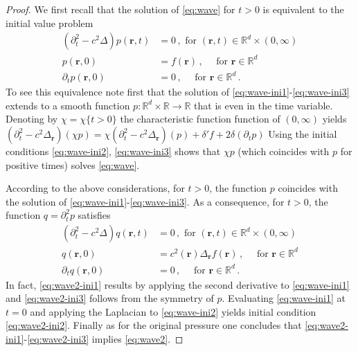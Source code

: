 \documentclass[11pt]{article}
\newcommand{\rr}{\mathbf r}
\newcommand{\source}{f}
\newcommand{\R}{\mathbb R}
\newcommand{\kl}[1]{(#1)}
\newcommand{\set}[1]{\{#1\}}
\begin{document}
\begin{proof}
	We first  recall that the solution of \eqref{eq:wave} for $t>0$  is
	equivalent to the initial value problem
	\begin{align}  \label{eq:wave-ini1}
		(\partial^2_t     -  c^2 \Delta) p(\rr,t)
		&=
		0 \,, \text{ for }
		\kl{\rr,t} \in
		\R^d \times \kl{0, \infty}
		\\ \label{eq:wave-ini2}
		p\kl{\rr,0}
		&=
		\source(\rr) \,,
		\quad \text{ for }
		\rr  \in \R^d
		\\ \label{eq:wave-ini3}
		\partial_t
		p\kl{\rr,0}
		&=0 \,,
		\quad \text{ for }
		\rr  \in \R^d \,.
	\end{align}
	To see this equivalence note first that the solution of
	\eqref{eq:wave-ini1}-\eqref{eq:wave-ini3}   extends to a smooth
	function $p\colon \R^d \times \R \to \R$ that is even in the time
	variable. Denoting by $\chi = \chi\set{t>0}$ the characteristic function
	function of $(0,\infty)$ yields
	$(\partial^2_t     -  c^2  \Delta_{\rr} ) (\chi p) = \chi (\partial^2_t -  c^2  \Delta_{\rr} ) ( p)
	+ \delta' \source  + 2 \delta (\partial_t  p) $
	Using the initial conditions \eqref{eq:wave-ini2}, \eqref{eq:wave-ini3}
	shows that $\chi p$ (which coincides with $p$ for positive times)
	solves \eqref{eq:wave}.
	
	
	According to the above considerations, for $t>0$, the function
	$p$ coincides with the solution of   \eqref{eq:wave-ini1}-\eqref{eq:wave-ini3}.
	As a consequence, for $t>0$, the function $q = \partial_t^2 p$ satisfies
	\begin{align}  \label{eq:wave2-ini1}
		(\partial^2_t     -  c^2 \Delta) q(\rr,t)
		&=
		0 \,, \text{ for }
		\kl{\rr,t} \in
		\R^d \times \kl{0, \infty}
		\\ \label{eq:wave2-ini2}
		q\kl{\rr,0}
		&=
		c^2(\rr) \Delta_{\rr} \source(\rr) \,,
		\quad \text{ for }
		\rr  \in \R^d
		\\ \label{eq:wave2-ini3}
		\partial_t
		q\kl{\rr,0}
		&=0 \,,
		\quad \text{ for }
		\rr  \in \R^d \,.
	\end{align}
	In fact, \eqref{eq:wave2-ini1} results by applying the second derivative  to
	\eqref{eq:wave-ini1} and \eqref{eq:wave2-ini3} follows from the symmetry of
	$p$. Evaluating \eqref{eq:wave-ini1} at $t=0$ and applying the Laplacian to
	\eqref{eq:wave-ini2} yields initial condition \eqref{eq:wave2-ini2}.  Finally as for the
	original pressure one concludes that  \eqref{eq:wave2-ini1}-\eqref{eq:wave2-ini3}
	implies \eqref{eq:wave2}.
\end{proof}
\end{document}
